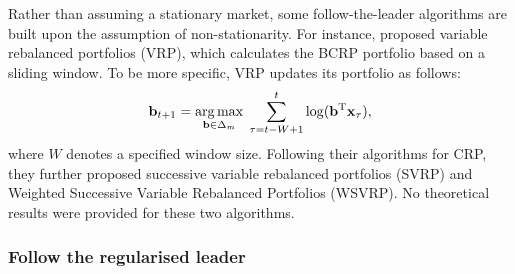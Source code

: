 Rather than assuming a stationary market, some follow-the-leader algorithms are built upon the assumption of non-stationarity. For instance, \citet{gaivoronski00} proposed variable rebalanced portfolios (VRP), which calculates the BCRP portfolio based on a sliding window. To be more specific, VRP updates its portfolio as follows:
\begin{equation}
	\mathbf{b}_{t+1}
	= \operatorname*{arg\,max}_{\mathbf{b}\in\Delta_m} \;  \sum_{\tau=t-W+1}^t \log(\mathbf{b}^\text{T}\mathbf{x}_\tau),
\end{equation}
where $W$ denotes a specified window size. Following their algorithms for CRP, they further proposed successive variable rebalanced portfolios (SVRP) and Weighted Successive Variable Rebalanced Portfolios (WSVRP). No theoretical results were provided for these two algorithms.
%
%
%
%
%
%
%
%
%
%
%
%
%


\subsubsection{Follow the regularised leader}

